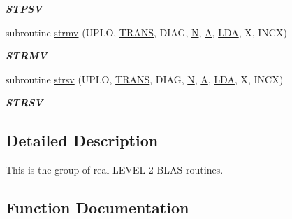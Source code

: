 \begin{DoxyCompactItemize}
\begin{DoxyCompactList}\small\item\em {\bfseries S\+T\+P\+S\+V} \end{DoxyCompactList}\item 
subroutine \hyperlink{group__single__blas__level2_ga2ff27ee8951accd778cd785023f71ac0}{strmv} (U\+P\+L\+O, \hyperlink{superlu__enum__consts_8h_a0c4e17b2d5cea33f9991ccc6a6678d62a1f61e3015bfe0f0c2c3fda4c5a0cdf58}{T\+R\+A\+N\+S}, D\+I\+A\+G, \hyperlink{polmisc_8c_a0240ac851181b84ac374872dc5434ee4}{N}, \hyperlink{classA}{A}, \hyperlink{example__user_8c_ae946da542ce0db94dced19b2ecefd1aa}{L\+D\+A}, X, I\+N\+C\+X)
\begin{DoxyCompactList}\small\item\em {\bfseries S\+T\+R\+M\+V} \end{DoxyCompactList}\item 
subroutine \hyperlink{group__single__blas__level2_ga59aeaec580e854d68c43c47e951637fe}{strsv} (U\+P\+L\+O, \hyperlink{superlu__enum__consts_8h_a0c4e17b2d5cea33f9991ccc6a6678d62a1f61e3015bfe0f0c2c3fda4c5a0cdf58}{T\+R\+A\+N\+S}, D\+I\+A\+G, \hyperlink{polmisc_8c_a0240ac851181b84ac374872dc5434ee4}{N}, \hyperlink{classA}{A}, \hyperlink{example__user_8c_ae946da542ce0db94dced19b2ecefd1aa}{L\+D\+A}, X, I\+N\+C\+X)
\begin{DoxyCompactList}\small\item\em {\bfseries S\+T\+R\+S\+V} \end{DoxyCompactList}\end{DoxyCompactItemize}


\subsection{Detailed Description}
This is the group of real L\+E\+V\+E\+L 2 B\+L\+A\+S routines. 

\subsection{Function Documentation}
\hypertarget{group__single__blas__level2_ga1677e779273da82f0e61504afd07264e}{}
